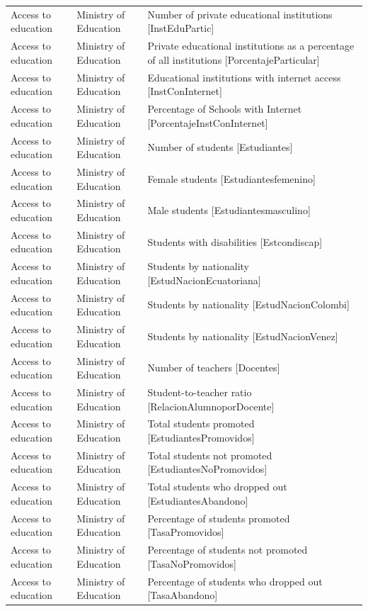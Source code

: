 \documentclass[10pt,a4paper]{article}
\begin{document}
\begin{longtable}{@{}>{\raggedright\arraybackslash}p{3.5cm}>{\raggedright\arraybackslash}p{5.6cm}>{\raggedright\arraybackslash}p{\dimexpr\textwidth-9.1cm-4\tabcolsep\relax}@{}}
Access to education & Ministry of Education & Number of private educational institutions [InstEduPartic]\\
Access to education & Ministry of Education & Private educational institutions as a percentage of all institutions [PorcentajeParticular]\\
Access to education & Ministry of Education & Educational institutions with internet access [InstConInternet]\\
Access to education & Ministry of Education & Percentage of Schools with Internet [PorcentajeInstConInternet]\\
Access to education & Ministry of Education & Number of students [Estudiantes]\\
Access to education & Ministry of Education & Female students [Estudiantesfemenino]\\
Access to education & Ministry of Education & Male students [Estudiantesmasculino]\\
Access to education & Ministry of Education & Students with disabilities [Estcondiscap]\\
Access to education & Ministry of Education & Students by nationality [EstudNacionEcuatoriana]\\
Access to education & Ministry of Education & Students by nationality [EstudNacionColombi]\\
Access to education & Ministry of Education & Students by nationality [EstudNacionVenez]\\
Access to education & Ministry of Education & Number of teachers [Docentes]\\
Access to education & Ministry of Education & Student-to-teacher ratio [RelacionAlumnoporDocente]\\
Access to education & Ministry of Education & Total students promoted [EstudiantesPromovidos]\\
Access to education & Ministry of Education & Total students not promoted [EstudiantesNoPromovidos]\\
Access to education & Ministry of Education & Total students who dropped out [EstudiantesAbandono]\\
Access to education & Ministry of Education & Percentage of students promoted [TasaPromovidos]\\
Access to education & Ministry of Education & Percentage of students not promoted [TasaNoPromovidos]\\
Access to education & Ministry of Education & Percentage of students who dropped out [TasaAbandono]\\

\end{longtable}
\end{document}
